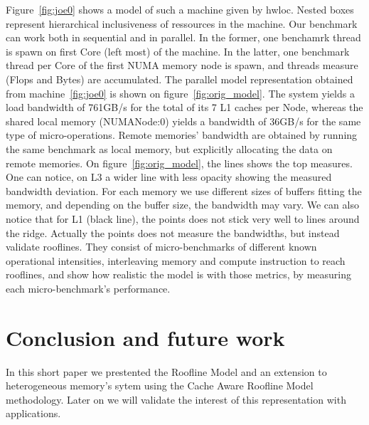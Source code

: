 \documentclass[twoside,twocolumn,8pt]{extarticle}
\begin{document}
Figure~\ref{fig:joe0} shows a model of such a machine given by hwloc.
Nested boxes represent hierarchical inclusiveness of ressources in the machine.
Our benchmark can work both in sequential and in parallel.
In the former, one benchamrk thread is spawn on first Core (left most) of the machine.
In the latter, one benchmark thread per Core of the first NUMA memory node is spawn, and threads measure (Flops and Bytes) are
accumulated.
The parallel model representation obtained from machine~\ref{fig:joe0} is shown on figure~\ref{fig:orig_model}.
The system yields a load bandwidth of 761GB/s for the total of its 7 L1 caches per Node, whereas the shared local memory
(NUMANode:0) yields a bandwidth of 36GB/s for the same type of micro-operations.
Remote memories' bandwidth are obtained by running the same benchmark as local memory, but explicitly allocating the data on remote
 memories.
On figure~\ref{fig:orig_model}, the lines shows the top measures.
One can notice, on L3 a wider line with less opacity showing the measured bandwidth deviation.
For each memory we use different sizes of buffers fitting the memory, and depending on the buffer size, the bandwidth may vary.
We can also notice that for L1 (black line), the points does not stick very well to lines around the ridge. Actually the points
does not measure the bandwidths, but instead validate rooflines. They consist of micro-benchmarks of different known operational
intensities, interleaving memory and compute instruction to reach rooflines, and show how realistic the model is with those
metrics, by measuring each micro-benchmark's performance.

\section{Conclusion and future work}\label{sec:conclusion}
In this short paper we prestented the Roofline Model and an extension to heterogeneous memory's sytem using the Cache Aware
Roofline Model methodology. Later on we will validate the interest of this representation with applications. 



\end{document}
